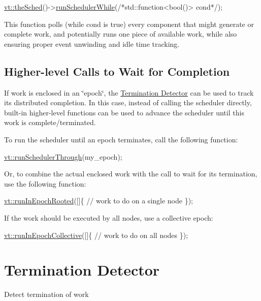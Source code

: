 \begin{DoxyCode}
\hyperlink{namespacevt_a4508b38e6ab664b64f1415aecbb83571}{vt::theSched}()->\hyperlink{structvt_1_1sched_1_1_scheduler_a9c130fc0ccbf237633420a7aa35069a4}{runSchedulerWhile}(\textcolor{comment}{/*std::function<bool()> cond*/});
\end{DoxyCode}


This function polls (while {\ttfamily cond} is true) every component that might generate or complete work, and potentially runs one piece of available work, while also ensuring proper event unwinding and idle time tracking.\hypertarget{scheduler_higher-level-calls}{}\subsection{Higher-\/level Calls to Wait for Completion}\label{scheduler_higher-level-calls}
If work is enclosed in an \char`\"{}epoch\char`\"{}, the \hyperlink{term}{Termination Detector} can be used to track its distributed completion. In this case, instead of calling the scheduler directly, built-\/in higher-\/level functions can be used to advance the scheduler until this work is complete/terminated.

To run the scheduler until an epoch terminates, call the following function\+:


\begin{DoxyCode}
\hyperlink{namespacevt_aa550774c1c9c668176ce535fd7d58fb0}{vt::runSchedulerThrough}(my\_epoch);
\end{DoxyCode}


Or, to combine the actual enclosed work with the call to wait for its termination, use the following function\+:


\begin{DoxyCode}
\hyperlink{namespacevt_a9f5cbbc484d7f14f2ad0ee46d62dfb6e}{vt::runInEpochRooted}([]\{
  \textcolor{comment}{// work to do on a single node}
\});
\end{DoxyCode}


If the work should be executed by all nodes, use a collective epoch\+:


\begin{DoxyCode}
\hyperlink{namespacevt_a2fc4ef34f30b49a1781d765804bfadbb}{vt::runInEpochCollective}([]\{
  \textcolor{comment}{// work to do on all nodes}
\});
\end{DoxyCode}
 \hypertarget{term}{}\section{Termination Detector}\label{term}
Detect termination of work

